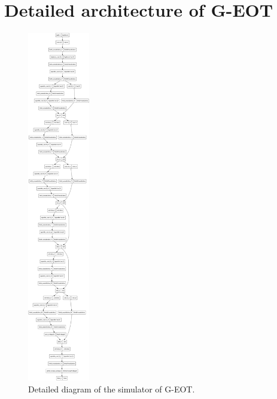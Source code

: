 \chapter{Detailed architecture of G-EOT}
    \label{app:detailed_architecture}

\begin{figure}[h]
    \centering
    \includegraphics[width=0.24\textwidth]{graphics/detailed_simulator.png}
    \caption{Detailed diagram of the simulator of G-EOT.}
\end{figure}

